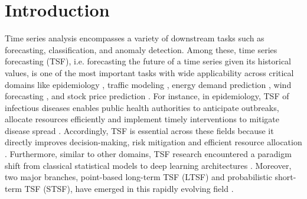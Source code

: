 \documentclass[a4paper,oneside,bibliography=totoc]{scrbook}
\begin{document}
\chapter{Introduction}
\label{ch:intro}
Time series analysis encompasses a variety of downstream tasks such as forecasting, classification, and anomaly detection. 
Among these, time series forecasting (TSF), i.e. forecasting the future of a time series given its historical values, is one of the most important tasks with wide applicability across critical domains like epidemiology \cite{wu_deep_2018, tapak_comparative_2019}, traffic modeling \cite{jayanthi_traffic_2021, raeesi_traffic_2014}, energy demand prediction \cite{wang_forecasting_2018}, wind forecasting \cite{xie_overview_2023}, and stock price prediction \cite{mehtab_time_2020}.
For instance, in epidemiology, TSF of infectious diseases enables public health authorities to anticipate outbreaks, allocate resources efficiently and implement timely interventions to mitigate disease spread \cite{tapak_comparative_2019}.
Accordingly, TSF is essential across these fields because it directly improves decision-making, risk mitigation and efficient resource allocation \cite{gneiting_probabilistic_2014}.
Furthermore, similar to other domains, TSF research encountered a paradigm shift from classical statistical models to deep learning architectures \cite{benidis_deep_2022, lim_time-series_2021}.
Moreover, two major branches, point-based long-term TSF (LTSF) and probabilistic short-term TSF (STSF), have emerged in this rapidly evolving field \cite{zhang_probts_2024}.
\newline
\end{document}
